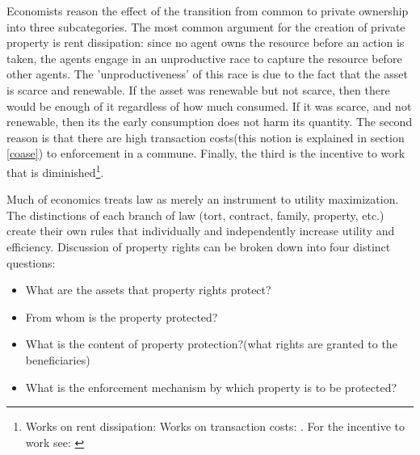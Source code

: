 Economists reason the effect of the transition from common to private ownership into three subcategories. The most common argument for the creation of private property is rent dissipation: since no agent owns the resource before an action is taken, the agents engage in an unproductive race to capture the resource before other agents. The 'unproductiveness' of this race is due to the fact that the asset is scarce and renewable. If the asset was renewable but not scarce, then there would be enough of it regardless of how much consumed. If it was scarce, and not renewable, then its the early consumption does not harm its quantity. The second reason is that there are high transaction costs(this notion is explained in section \ref{coase}) to enforcement in a commune. Finally, the third is the incentive to work that is diminished\footnote{ Works on rent dissipation:\cite{dasgupta1979economic} \cite{gordon1954economic} \cite{Cheung1970} \cite{schaefer1957some} \cite{scott1955fishery} \cite{clark1990optimal} Works on transaction costs: \cite{coase1960problem} \cite{demsetz1983structure}. For the incentive to work see: \cite{north1990} }.

Much of economics treats law as merely an instrument to utility maximization. The distinctions of each branch of law (tort, contract, family, property, etc.) create their own rules that individually and independently increase utility and efficiency. Discussion of property rights can be broken down into four distinct questions:

\begin{itemize}
  \item What are the assets that property rights protect?
  \item From whom is the property protected?
  \item What is the content of property protection?(what rights are granted to the beneficiaries)
  \item What is the enforcement mechanism by which property is to be protected?  
\end{itemize}

